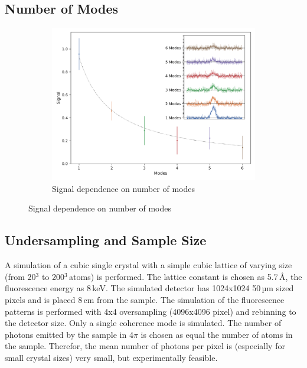\subsection{Number of Modes}
\begin{figure}
	\centering
	\begin{subfigure}[b]{0.4\textwidth}
		\includegraphics[width=\linewidth]{images/modes_signal.pdf}
		\caption{Signal dependence on number of modes}
		\label{fig:modes}
	\end{subfigure}
\end{figure}

\subsection{Undersampling and  Sample Size}


A simulation of a cubic single crystal with a simple cubic lattice of varying size (from 20$^3$ to 200$^3$\,atoms) is performed. The lattice constant is chosen as 5.7\,\AA, the fluorescence energy as 8\,keV. The simulated detector has 1024x1024 50\,µm sized pixels and is placed 8\,cm from the  sample. 
The simulation of the fluorescence patterns is performed with 4x4 oversampling (4096x4096 pixel) and rebinning to the detector size. Only a single coherence mode is simulated. The number of photons emitted by the sample in 4$\pi$ is chosen as equal the number of atoms in the sample. Therefor, the mean number of photons per pixel is (especially for small crystal sizes) very small, but experimentally feasible.

